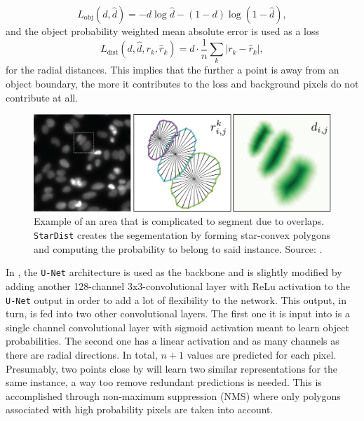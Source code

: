 \begin{equation}\label{eqbceloss}
	L_{\text{obj}}(d,\hat{d})=-d\log\hat{d}-(1-d)\log(1-\hat{d}),
\end{equation}
and the object probability weighted mean absolute error is used as a loss
\begin{equation}
	L_{\text{dist}}(d,\hat{d},r_k,\hat{r}_k)=d\cdot\frac{1}{n}\sum_k|r_k-\hat{r}_k|,
\end{equation}
for the radial distances. This implies that the further a point is away from an object boundary, the more it contributes to the loss and background pixels do not contribute at all.
\begin{figure}
	\centering
	\includegraphics[width=\textwidth]{"images/star_convexity_explained.png"}
	\caption[\texttt{StarDist} summarized]{Example of an area that is complicated to segment due to overlaps. \texttt{StarDist} creates the segementation by forming star-convex polygons and computing the probability to belong to said instance. Source: \Cite{schmidt2018}.}
	\label{figstardistexplained}
\end{figure}

In \stardist, the \texttt{U-Net} architecture \cite{RonnebergerFB15} is used as the backbone and is slightly modified by adding another 128-channel 3x3-convolutional layer with ReLu activation to the \texttt{U-Net} output in order to add a lot of flexibility to the network. This output, in turn, is fed into two other convolutional layers. The first one it is input into is a single channel convolutional layer with sigmoid activation meant to learn object probabilities. The second one has a linear activation and as many channels as there are radial directions. In total, $n+1$ values are predicted for each pixel. Presumably, two points close by will learn two similar representations for the same instance, a way too remove redundant predictions is needed. This is accomplished through non-maximum suppression (NMS) \cite{hosang2017learning, ren2016faster} where only polygons associated with high probability pixels are taken into account.